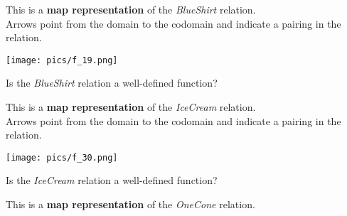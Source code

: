 \documentclass{ximera}
\author{Lee Wayand}
\begin{document}
\begin{exercise}


\begin{question}

This is a \textbf{map representation} of the \textit{BlueShirt} relation. \\

Arrows point from the domain to the codomain and indicate a pairing in the relation.

\begin{image}
\texttt{[image: pics/f\_19.png]}
\end{image}

Is the \textit{BlueShirt} relation a well-defined function?

\begin{multipleChoice}
\end{multipleChoice}

\end{question}






\begin{question}

This is a \textbf{map representation} of the \textit{IceCream} relation. \\

Arrows point from the domain to the codomain and indicate a pairing in the relation.

\begin{image}
\texttt{[image: pics/f\_30.png]}
\end{image}

Is the \textit{IceCream} relation a well-defined function?

\begin{multipleChoice}
\end{multipleChoice}

\end{question}











\begin{question}

This is a \textbf{map representation} of the \textit{OneCone} relation. \\


\end{question}
\end{exercise}
\end{document}
